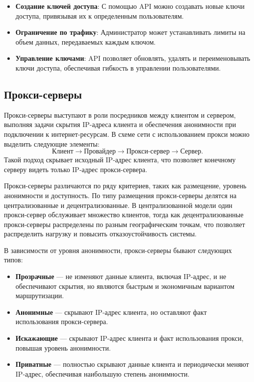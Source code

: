 \documentclass{SCWorks}
\begin{document}
\begin{itemize}
    \item \textbf{Создание ключей доступа}: С помощью API можно создавать новые ключи доступа, привязывая их к определенным пользователям.
    \item \textbf{Ограничение по трафику}: Администратор может устанавливать лимиты на объем данных, передаваемых каждым ключом.
    \item \textbf{Управление ключами}: API позволяет обновлять, удалять и переименовывать ключи доступа, обеспечивая гибкость в управлении пользователями.
\end{itemize}

\subsection{Прокси-серверы}

Прокси-серверы выступают в роли посредников между клиентом и сервером, выполняя задачи скрытия IP-адреса клиента и обеспечения анонимности при подключении к интернет-ресурсам. В схеме сети с использованием прокси можно выделить следующие элементы:
\[
\text{Клиент} \rightarrow \text{Провайдер} \rightarrow \text{Прокси-сервер} \rightarrow \text{Сервер}.
\]
Такой подход скрывает исходный IP-адрес клиента, что позволяет конечному серверу видеть только IP-адрес прокси-сервера.

Прокси-серверы различаются по ряду критериев, таких как размещение, уровень анонимности и доступность. По типу размещения прокси-серверы делятся на централизованные и децентрализованные. В централизованной модели один прокси-сервер обслуживает множество клиентов, тогда как децентрализованные прокси-серверы распределены по разным географическим точкам, что позволяет распределить нагрузку и повысить отказоустойчивость системы.

В зависимости от уровня анонимности, прокси-серверы бывают следующих типов:
\begin{itemize}
    \item \textbf{Прозрачные} — не изменяют данные клиента, включая IP-адрес, и не обеспечивают скрытия, но являются быстрым и экономичным вариантом маршрутизации.
    \item \textbf{Анонимные} — скрывают IP-адрес клиента, но оставляют факт использования прокси-сервера.
    \item \textbf{Искажающие} — скрывают IP-адрес клиента и факт использования прокси, повышая уровень анонимности.
    \item \textbf{Приватные} — полностью скрывают данные клиента и периодически меняют IP-адрес, обеспечивая наибольшую степень анонимности.
\end{itemize}
\end{document}
